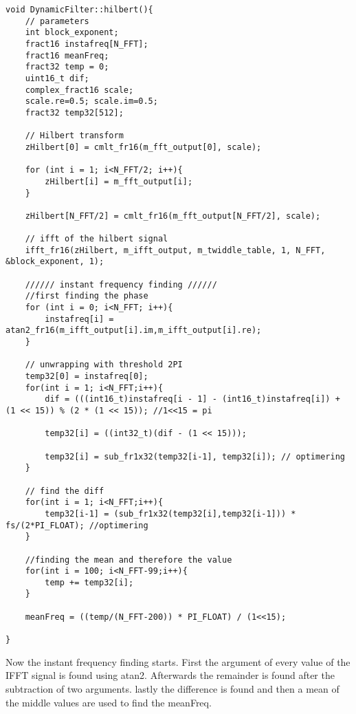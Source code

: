 \begin{verbatim}
void DynamicFilter::hilbert(){
	// parameters
	int block_exponent;
	fract16 instafreq[N_FFT];
	fract16 meanFreq;
	fract32 temp = 0;
	uint16_t dif;
	complex_fract16 scale;
	scale.re=0.5; scale.im=0.5;
	fract32 temp32[512];
			
	// Hilbert transform
	zHilbert[0] = cmlt_fr16(m_fft_output[0], scale);
	
	for (int i = 1; i<N_FFT/2; i++){
		zHilbert[i] = m_fft_output[i];
	}
		
	zHilbert[N_FFT/2] = cmlt_fr16(m_fft_output[N_FFT/2], scale);
	
	// ifft of the hilbert signal
	ifft_fr16(zHilbert, m_ifft_output, m_twiddle_table, 1, N_FFT, &block_exponent, 1);
		
	////// instant frequency finding //////
	//first finding the phase
	for (int i = 0; i<N_FFT; i++){
		instafreq[i] = atan2_fr16(m_ifft_output[i].im,m_ifft_output[i].re);
	}
	
	// unwrapping with threshold 2PI
	temp32[0] = instafreq[0];
	for(int i = 1; i<N_FFT;i++){
		dif = (((int16_t)instafreq[i - 1] - (int16_t)instafreq[i]) + (1 << 15)) % (2 * (1 << 15)); //1<<15 = pi
		
		temp32[i] = ((int32_t)(dif - (1 << 15)));
			
		temp32[i] = sub_fr1x32(temp32[i-1],	temp32[i]); // optimering
	}
		
	// find the diff
	for(int i = 1; i<N_FFT;i++){
		temp32[i-1] = (sub_fr1x32(temp32[i],temp32[i-1])) * fs/(2*PI_FLOAT); //optimering
	}
		
	//finding the mean and therefore the value
	for(int i = 100; i<N_FFT-99;i++){
		temp += temp32[i];
	}
		
	meanFreq = ((temp/(N_FFT-200)) * PI_FLOAT) / (1<<15);
		
}
\end{verbatim}
Now the instant frequency finding starts. First the argument of every value of the IFFT signal is found using atan2. Afterwards the remainder is found after the subtraction of two arguments. lastly the difference is found and then a mean of the middle values are used to find the meanFreq.

